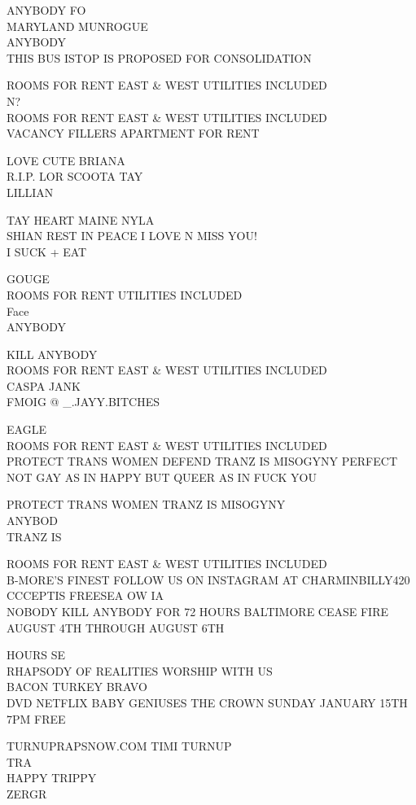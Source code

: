 \documentclass[10pt,letterpaper]{article}
\begin{document}
ANYBODY FO\\
MARYLAND MUNROGUE\\
ANYBODY\\
THIS BUS ISTOP IS PROPOSED FOR CONSOLIDATION

ROOMS FOR RENT EAST \& WEST UTILITIES INCLUDED\\
N?\\
ROOMS FOR RENT EAST \& WEST UTILITIES INCLUDED\\
VACANCY FILLERS APARTMENT FOR RENT

LOVE CUTE BRIANA\\
R.I.P. LOR SCOOTA TAY\\
LILLIAN

TAY HEART MAINE NYLA\\
SHIAN REST IN PEACE I LOVE N MISS YOU!\\
I SUCK + EAT

GOUGE\\
ROOMS FOR RENT UTILITIES INCLUDED\\
Face\\
ANYBODY

KILL ANYBODY\\
ROOMS FOR RENT EAST \& WEST UTILITIES INCLUDED\\
CASPA JANK\\
FMOIG @ \_.JAYY.BITCHES

EAGLE\\
ROOMS FOR RENT EAST \& WEST UTILITIES INCLUDED\\
PROTECT TRANS WOMEN DEFEND TRANZ IS MISOGYNY PERFECT\\
NOT GAY AS IN HAPPY BUT QUEER AS IN FUCK YOU

PROTECT TRANS WOMEN TRANZ IS MISOGYNY\\
ANYBOD\\
TRANZ IS

ROOMS FOR RENT EAST \& WEST UTILITIES INCLUDED\\
B{-}MORE'S FINEST FOLLOW US ON INSTAGRAM AT CHARMINBILLY420\\
CCCEPTIS FREESEA OW IA\\
NOBODY KILL ANYBODY FOR 72 HOURS BALTIMORE CEASE FIRE AUGUST 4TH THROUGH AUGUST 6TH

HOURS SE\\
RHAPSODY OF REALITIES WORSHIP WITH US\\
BACON TURKEY BRAVO\\
DVD NETFLIX BABY GENIUSES THE CROWN SUNDAY JANUARY 15TH 7PM FREE

TURNUPRAPSNOW.COM TIMI TURNUP\\
TRA\\
HAPPY TRIPPY\\
ZERGR
\end{document}
